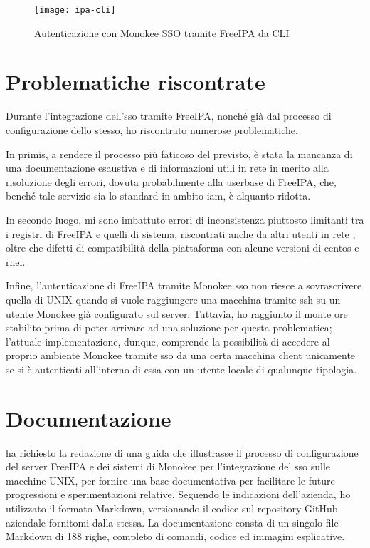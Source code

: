 \begin{figure}[H] 
    \centering 
    \texttt{[image: ipa-cli]} 
    \caption{Autenticazione con Monokee SSO tramite FreeIPA da CLI}
    \label{fig:ipa-cli}
\end{figure}


\section{Problematiche riscontrate}

Durante l'integrazione dell'\acrshort{sso} tramite FreeIPA, nonché già dal processo di configurazione dello stesso, ho riscontrato numerose problematiche.

In primis, a rendere il processo più faticoso del previsto, è stata la mancanza di una  documentazione esaustiva e di informazioni utili in rete in merito alla risoluzione degli errori, dovuta probabilmente alla userbase di FreeIPA, che, benché tale servizio sia lo standard in ambito \acrshort{iam}, è alquanto ridotta.

In secondo luogo, mi sono imbattuto errori di inconsistenza piuttosto limitanti tra i registri di FreeIPA e quelli di sistema, riscontrati anche da altri utenti in rete\cite{site:redhat-bugzilla} \cite{site:freeipa-issue} \cite{site:freeipa-users-1} \cite{site:freeipa-users-2} \cite{site:freeipa-users-3} \cite{site:centos-forums}, oltre che difetti di compatibilità della piattaforma con alcune versioni di \acrshort{centos} e \acrshort{rhel}.

Infine, l'autenticazione di FreeIPA tramite Monokee \acrshort{sso} non riesce a sovrascrivere quella di UNIX quando si vuole raggiungere una macchina tramite \acrshort{ssh} su un utente Monokee già configurato sul server. Tuttavia, ho raggiunto il monte ore stabilito prima di poter arrivare ad una soluzione per questa problematica; l'attuale implementazione, dunque, comprende la possibilità di accedere al proprio ambiente Monokee tramite \acrshort{sso} da una certa macchina client unicamente se si è autenticati all'interno di essa con un utente locale di qualunque tipologia.

\section{Documentazione}

\myAzienda ha richiesto la redazione di una guida che illustrasse il processo di configurazione del server FreeIPA e dei sistemi di Monokee per l'integrazione del \acrshort{sso} sulle macchine UNIX, per fornire una base documentativa per facilitare le future progressioni e sperimentazioni relative. Seguendo le indicazioni dell'azienda, ho utilizzato il formato Markdown, versionando il codice sul repository GitHub aziendale fornitomi dalla stessa\cite{site:docs}. La documentazione consta di un singolo file Markdown di 188 righe, completo di comandi, codice ed immagini esplicative.



